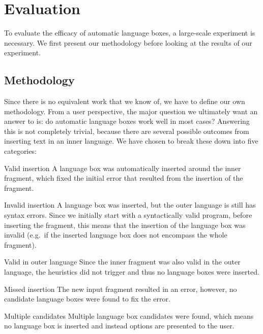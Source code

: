 \documentclass[sigplan,screen]{acmart}\settopmatter{printfolios=true,printccs=false,printacmref=false}
\begin{document}
\section{Evaluation}
\label{sec:evaluation}

To evaluate the efficacy of automatic language boxes, a large-scale experiment
is necessary. We first present our methodology before looking at the results of
our experiment.


\subsection{Methodology}

Since there is no equivalent work that we know of, we have to
define our own methodology. From a user perspective, the major question we
ultimately want an answer to is: do automatic language boxes work well in most
cases? Answering this is not completely trivial, because there are several
possible outcomes from inserting text in an inner language. We have chosen to
break these down into five categories:

\begin{description*}
  \item[Valid insertion] A language box was automatically inserted around the inner fragment, which fixed the initial error that resulted from the insertion of the fragment.
  \item[Invalid insertion] A language box was inserted, but the outer language is still has syntax errors. Since we initially start with a syntactically valid program, before inserting the fragment, this means that the insertion of the language box was invalid (e.g.~if the inserted language box does not encompass the whole fragment).
  \item[Valid in outer language] Since the inner fragment was also valid in the outer language, the heuristics did not trigger and thus no language boxes were inserted.
  \item[Missed insertion] The new input fragment resulted in an error, however, no candidate language boxes were found to fix the error.
  \item[Multiple candidates] Multiple language box candidates were found, which means no language box is inserted and instead options are presented to the user.
\end{description*}
\end{document}

